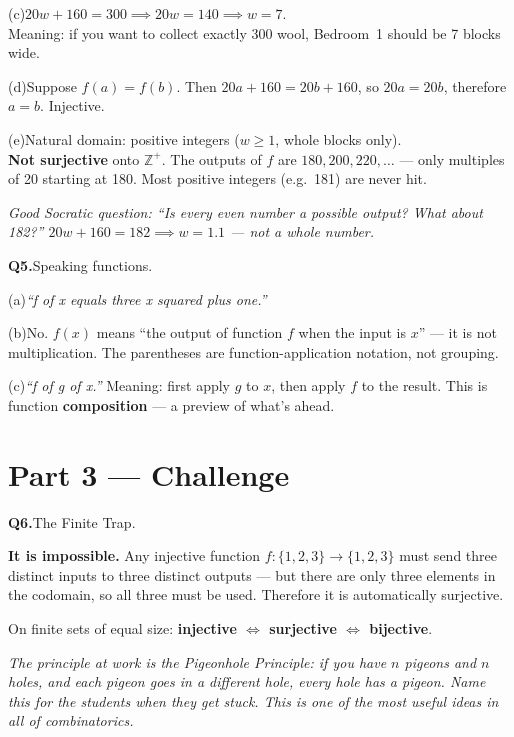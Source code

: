 \documentclass[12pt]{article}
\begin{document}
(c)\quad $20w + 160 = 300 \implies 20w = 140 \implies w = 7$.\\
Meaning: if you want to collect exactly 300 wool, Bedroom~1 should be 7 blocks wide.

(d)\quad Suppose $f(a) = f(b)$. Then $20a + 160 = 20b + 160$, so $20a = 20b$,
therefore $a = b$. Injective. \checkmark

(e)\quad Natural domain: positive integers ($w \geq 1$, whole blocks only).\\
\textbf{Not surjective} onto $\mathbb{Z}^+$. The outputs of $f$ are $180, 200, 220, \ldots$
--- only multiples of 20 starting at 180. Most positive integers (e.g.\ 181) are never hit.

\textit{Good Socratic question: ``Is every even number a possible output?
What about 182?'' $20w + 160 = 182 \implies w = 1.1$ --- not a whole number.}

\bigskip
\textbf{Q5.}\quad Speaking functions.

(a)\quad \textit{``f of x equals three x squared plus one.''}

(b)\quad No. $f(x)$ means ``the output of function $f$ when the input is $x$'' ---
it is not multiplication. The parentheses are function-application notation, not grouping.

(c)\quad \textit{``f of g of x.''} Meaning: first apply $g$ to $x$, then apply $f$
to the result. This is function \textbf{composition} --- a preview of what's ahead.

\section*{Part 3 --- Challenge}

\textbf{Q6.}\quad The Finite Trap.

\textbf{It is impossible.} Any injective function $f\colon \{1,2,3\} \to \{1,2,3\}$
must send three distinct inputs to three distinct outputs --- but there are only three
elements in the codomain, so all three must be used. Therefore it is automatically
surjective.

On finite sets of equal size: \textbf{injective $\iff$ surjective $\iff$ bijective}.

\textit{The principle at work is the Pigeonhole Principle: if you have $n$ pigeons
and $n$ holes, and each pigeon goes in a different hole, every hole has a pigeon.
Name this for the students when they get stuck. This is one of the most useful
ideas in all of combinatorics.}
\end{document}
